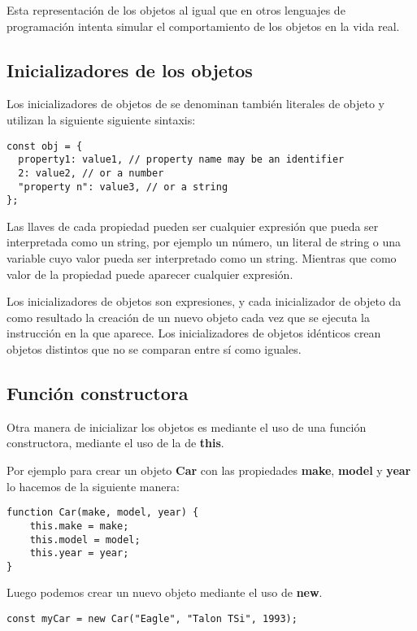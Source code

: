 \documentclass{article}
\begin{document}
Esta representación de los objetos al igual que en otros lenguajes de programación intenta simular el comportamiento
de los objetos en la vida real.

\subsection{Inicializadores de los objetos}

Los inicializadores de objetos de se denominan también literales de objeto y utilizan la siguiente siguiente sintaxis:

\begin{lstlisting}
const obj = {
  property1: value1, // property name may be an identifier
  2: value2, // or a number
  "property n": value3, // or a string
};
\end{lstlisting}

Las llaves de cada propiedad pueden ser cualquier expresión que pueda ser interpretada como un string,
por ejemplo un número, un literal de string o una variable cuyo valor pueda ser interpretado como un string.
Mientras que como valor de la propiedad puede aparecer cualquier expresión.

Los inicializadores de objetos son expresiones, y cada inicializador de
objeto da como resultado la creación de un nuevo objeto cada vez que se
ejecuta la instrucción en la que aparece. Los inicializadores de objetos idénticos crean objetos distintos que no se comparan entre sí como iguales.

\subsection{Función constructora}

Otra manera de inicializar los objetos es mediante el uso de una función constructora, mediante el uso de la
de \textbf{this}.

Por ejemplo para crear un objeto \textbf{Car} con las propiedades \textbf{make}, \textbf{model} y \textbf{year}
lo hacemos de la siguiente manera:

\begin{lstlisting}
function Car(make, model, year) {
    this.make = make;
    this.model = model;
    this.year = year;
}
\end{lstlisting}

Luego podemos crear un nuevo objeto mediante el uso de \textbf{new}.

\begin{lstlisting}
const myCar = new Car("Eagle", "Talon TSi", 1993);
\end{lstlisting}
\end{document}
